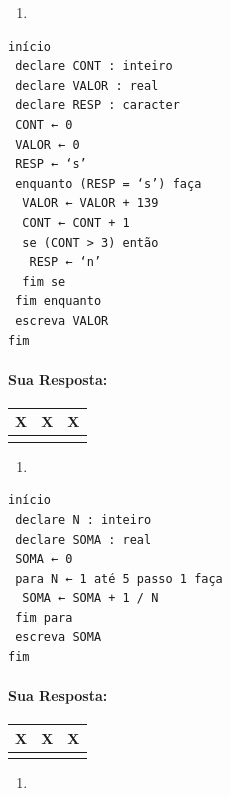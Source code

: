 \documentclass[12pt,a4paper]{article}
\providecommand{\tightlist}{%
      \setlength{\itemsep}{0pt}\setlength{\parskip}{0pt}}
\begin{document}
    \begin{enumerate}
\def\labelenumi{\alph{enumi})}
\setcounter{enumi}{5}
\tightlist
\item
\end{enumerate}

\begin{verbatim}
início
 declare CONT : inteiro
 declare VALOR : real
 declare RESP : caracter
 CONT ← 0
 VALOR ← 0
 RESP ← ‘s’
 enquanto (RESP = ‘s’) faça
  VALOR ← VALOR + 139
  CONT ← CONT + 1
  se (CONT > 3) então
   RESP ← ‘n’
  fim se
 fim enquanto
 escreva VALOR
fim
\end{verbatim}

    \hypertarget{sua-resposta}{%
\paragraph{Sua Resposta:}\label{sua-resposta}}

\begin{longtable}[]{@{}ccc@{}}
\toprule()
X & X & X \\
\midrule()
\endhead
& & \\
\bottomrule()
\end{longtable}

    \begin{enumerate}
\def\labelenumi{\alph{enumi})}
\setcounter{enumi}{6}
\tightlist
\item
\end{enumerate}

\begin{verbatim}
início
 declare N : inteiro
 declare SOMA : real
 SOMA ← 0
 para N ← 1 até 5 passo 1 faça
  SOMA ← SOMA + 1 / N
 fim para
 escreva SOMA
fim 
\end{verbatim}

    \hypertarget{sua-resposta}{%
\paragraph{Sua Resposta:}\label{sua-resposta}}

\begin{longtable}[]{@{}ccc@{}}
\toprule()
X & X & X \\
\midrule()
\endhead
& & \\
\bottomrule()
\end{longtable}

    \begin{enumerate}
\def\labelenumi{\alph{enumi})}
\setcounter{enumi}{7}
\tightlist
\item
\end{enumerate}
\end{document}
